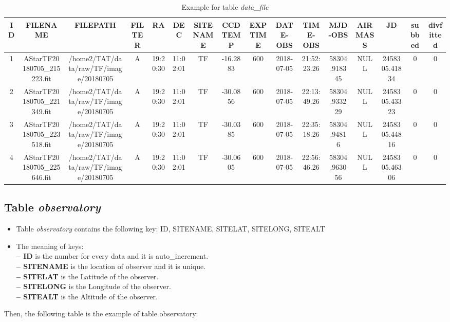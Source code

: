 \documentclass[12pt]{article}    %
\begin{document}
	\begin{table}[!htbp]
		\centering
		\caption{Example for table {\it data\_file}}
		\resizebox{\textwidth}{!}
		{
		\begin{tabular}{|*{16}{c|}}
			\hline
			ID & FILENAME & FILEPATH & FILTER & RA & DEC & SITENAME & CCDTEMP & EXPTIME & DATE-OBS & TIME-OBS & MJD-OBS & AIRMASS & JD & subbed & divfitted  \\ \hline
			1 & AStarTF20180705\_215223.fit & /home2/TAT/data/raw/TF/image/20180705 & A & 19:20:30 & 11:02:01 & TF & -16.2883 & 600 & 2018-07-05 &	21:52:23.26 & 58304.918345 & NULL & 2458305.41834 & 0 & 0 \\ \hline 
			2 & AStarTF20180705\_221349.fit & /home2/TAT/data/raw/TF/image/20180705 & A & 19:20:30 & 11:02:01 & TF & -30.0856 & 600 & 2018-07-05 &	22:13:49.26 & 58304.933229 & NULL & 2458305.43323 & 0 & 0 \\ \hline
			3 & AStarTF20180705\_223518.fit & /home2/TAT/data/raw/TF/image/20180705 & A & 19:20:30 & 11:02:01 & TF & -30.0385 & 600 & 2018-07-05 & 	22:35:18.26 & 58304.94816 & NULL & 2458305.44816 & 0 & 0 \\ \hline
			4 & AStarTF20180705\_225646.fit & /home2/TAT/data/raw/TF/image/20180705 & A & 19:20:30 & 11:02:01 & TF & -30.0605 & 600 & 2018-07-05 &	22:56:46.26 & 58304.963056 & NULL & 2458305.46306 & 0 & 0 \\ \hline 
		\end{tabular}
		}
	\end{table}

	\subsection{Table {\it observatory}}
	\begin{itemize}
		\item Table {\it observatory} contains the following key:
		\footnotesize
		\indent ID, SITENAME, SITELAT, SITELONG, SITEALT
		\normalsize
		\item The meaning of keys:\\[0.2cm]
		\textbf {-- ID} is the number for every data and it is auto\_increment.\\
		\textbf {-- SITENAME} is the location of observer and it is unique.\\
		\textbf {-- SITELAT} is the Latitude of the observer. \\
		\textbf {-- SITELONG} is the Longitude of the observer.\\
		\textbf {-- SITEALT} is the Altitude of the observer.
	\end{itemize}
	Then, the following table is the example of table observatory:
	
\end{document}
